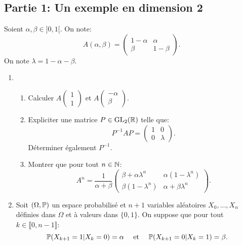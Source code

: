 
\subsection*{Partie 1: Un exemple en dimension 2}

Soient $\alpha, \beta \in ]0,1[$. On note:
\[ A(\alpha, \beta) = \begin{pmatrix}
                       1-\alpha & \alpha \\
                       \beta & 1-\beta
                      \end{pmatrix}.\]
On note $\lambda = 1-\alpha -\beta$. 


\begin{enumerate}
\item \begin{enumerate}
  \item Calculer $A\begin{pmatrix} 1 \\ 1 \end{pmatrix}$ et $A\begin{pmatrix} -\alpha \\ \beta \end{pmatrix}$. 

  \item Expliciter une matrice $P\in \GL_{2}(\R)$ telle que:
\[
P^{-1}AP = \begin{pmatrix}  1 & 0\\ 0 & \lambda \end{pmatrix}.
\]
Déterminer également $P^{-1}$.

  \item Montrer que pour tout $n\in \N$:
\[ 
A^{n} = \frac{1}{\alpha  + \beta} 
  \begin{pmatrix}
      \beta + \alpha \lambda^{n} & \alpha (1-\lambda^{n})\\
      \beta (1-\lambda^{n}) & \alpha + \beta \lambda^{n}
   \end{pmatrix}.
\]

\end{enumerate}


\item Soit $(\Omega, \P)$ un espace probabilisé et $n+1$ variables aléatoires $X_{0}, ..., X_{n}$ définies dans $\Omega$ et à valeurs dans $\{ 0, 1\}$. On suppose que pour tout $k\in \llbracket 0, n-1\rrbracket$:
\[ \P(X_{k+1} = 1|X_{k} = 0) = \alpha \quad \text{ et } \quad \P(X_{k+1} = 0|X_{k} = 1) = \beta.\]


\end{enumerate}
